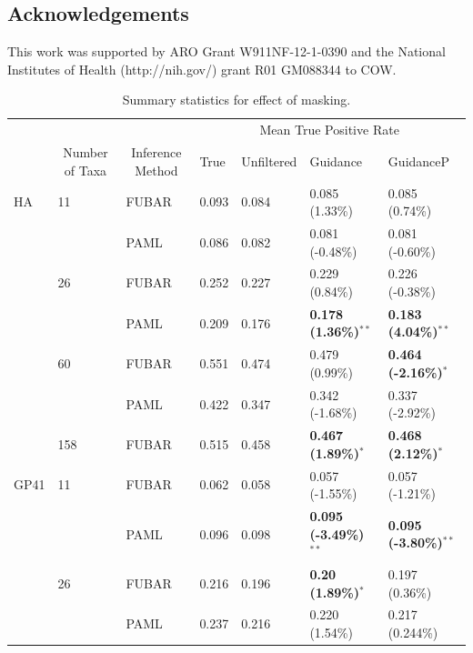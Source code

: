 \documentclass[11pt]{article}
\begin{document}
\subsection*{Acknowledgements}
This work was supported by ARO Grant W911NF-12-1-0390 and the National Institutes of Health (http://nih.gov/) grant R01 GM088344 to COW.



	

\begin{table}[htbp]
\begin{adjustwidth}{-1.85cm}{}
\caption {\label{tab:summarystats} Summary statistics for effect of masking.}
\begin{tabular}{l l l l l l l}
\hline\noalign{\smallskip}
& & & \multicolumn{4}{c}{Mean True Positive Rate} \\
\cline{4-7}\noalign{\smallskip}
\multicolumn{1}{c}{Selective Profile} & \multicolumn{1}{c}{Number of Taxa} & \multicolumn{1}{c}{Inference Method} & \multicolumn{1}{l}{True} & \multicolumn{1}{l}{Unfiltered} & \multicolumn{1}{l}{Guidance} & \multicolumn{1}{l}{GuidanceP} \\
\noalign{\smallskip}\hline\noalign{\smallskip}
HA  &  11  &  FUBAR  &  0.093  &  0.084  &  0.085 (1.33\%)  &  0.085 (0.74\%) \\
  &    &  PAML  &  0.086  &  0.082  &  0.081 (-0.48\%)  &  0.081 (-0.60\%)\\
\hline
 & 26 & FUBAR & 0.252 & 0.227 & 0.229 (0.84\%) & 0.226 (-0.38\%) \\
 &   & PAML & 0.209 & 0.176 & \textbf{0.178 (1.36\%)$^{\ast\ast}$} & \textbf{0.183 (4.04\%)$^{\ast\ast}$} \\
\hline
 & 60 & FUBAR & 0.551 & 0.474 & 0.479 (0.99\%) & \textbf{0.464 (-2.16\%)$^{\ast}$}  \\
 &  & PAML & 0.422 & 0.347 & 0.342 (-1.68\%) & 0.337 (-2.92\%) \\
 \hline
 & 158 & FUBAR & 0.515 & 0.458 & \textbf{0.467 (1.89\%)$^{\ast}$} & \textbf{0.468 (2.12\%)$^{\ast}$} \\
\hline
GP41  &  11 &  FUBAR  &  0.062  &  0.058  &  0.057 (-1.55\%)  &  0.057 (-1.21\%)\\
  &    &  PAML  &  0.096  &  0.098  &  \textbf{0.095 (-3.49\%)$^{\ast\ast}$}  &  \textbf{0.095 (-3.80\%)$^{\ast\ast}$} \\
\hline
 & 26 & FUBAR & 0.216 & 0.196 & \textbf{0.20 (1.89\%)$^{\ast}$} & 0.197 (0.36\%) \\
 & & PAML & 0.237 & 0.216 & 0.220 (1.54\%) & 0.217 (0.244\%) \\

\end{tabular}
\end{adjustwidth}
\end{table}
\end{document}
